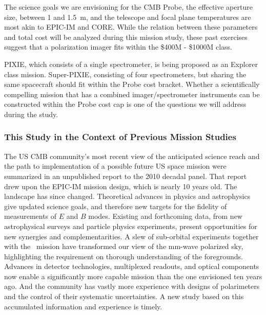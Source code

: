 
The science goals we are envisioning for the CMB Probe, the effective aperture size, between 1 and 1.5~m,
and the telescope and focal plane temperatures are most akin to EPIC-IM and CORE. While the relation 
between these parameters and total cost will be analyzed during this 
mission study, these past exercises suggest that a polarization imager fits within the \$400M - \$1000M class.

PIXIE, which consists of a single spectrometer, is being proposed as an Explorer class mission. 
Super-PIXIE, consisting of four spectrometers, but sharing the same spacecraft should fit 
within the Probe cost bracket. Whether a scientifically compelling mission that has 
a combined imager/spectrometer instruments can be constructed within the Probe cost cap 
is one of the questions we will address during the study. 


\vspace{-0.18in}

\subsubsection{This Study in the Context of Previous Mission Studies} 

\vspace{-0.05in}

The US CMB community's most recent view of the anticipated 
science reach and the path to implementation of a possible future US space mission
were summarized in an unpublished report to the 2010 decadal panel. That report 
drew upon the EPIC-IM mission design, which is nearly 10 years old.  The landscape 
has since changed.  Theoretical advances in physics and astrophysics
give updated science goals, and therefore new targets for the fidelity of measurements of $E$ and $B$ 
modes. Existing and forthcoming data, from new astrophysical surveys and particle physics 
experiments, present opportunities for new synergies and complementarities. 
A slew of sub-orbital experiments together with the \planck\ mission have 
transformed our view of the mm-wave polarized sky, highlighting the requirement on 
thorough understanding of the foregrounds. Advances in detector technologies, multiplexed readouts,
and optical components now enable a significantly more capable mission than the one envisioned
ten years ago. And the community has vastly more experience with designs of polarimeters and 
the control of their systematic uncertainties.  A new study based on this accumulated information and 
experience is timely. 


